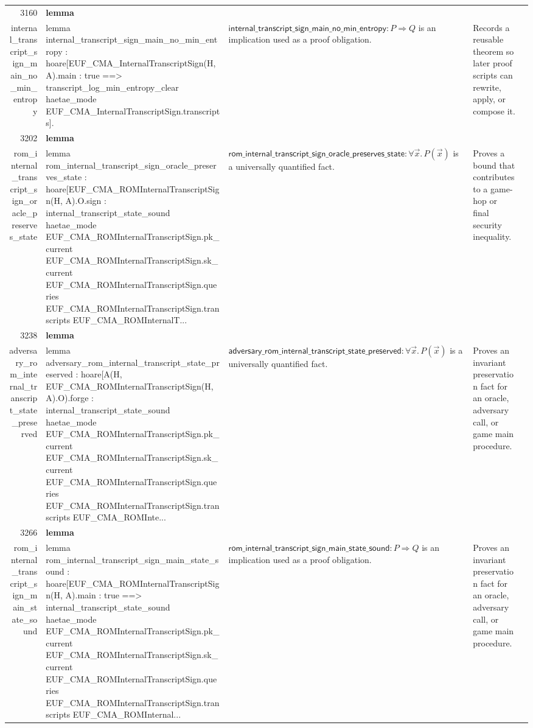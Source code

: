 \documentclass[10pt]{article}
\newcommand{\ec}[1]{\begingroup\ttfamily\scriptsize #1\endgroup}
\begin{document}
\begin{longtable}{r L{0.17\textwidth} L{0.26\textwidth} L{0.27\textwidth} L{0.20\textwidth}}
3160 & \textbf{lemma}\\\ec{internal\_transcript\_sign\_main\_no\_min\_entropy} & \ec{lemma internal\_transcript\_sign\_main\_no\_min\_entropy : hoare[EUF\_CMA\_InternalTranscriptSign(H, A).main : true ==> transcript\_log\_min\_entropy\_clear haetae\_mode EUF\_CMA\_InternalTranscriptSign.transcripts].} & \(\mathsf{internal\_transcript\_sign\_main\_no\_min\_entropy} : P \Rightarrow Q\) is an implication used as a proof obligation. & Records a reusable theorem so later proof scripts can rewrite, apply, or compose it. \\
3202 & \textbf{lemma}\\\ec{rom\_internal\_transcript\_sign\_oracle\_preserves\_state} & \ec{lemma rom\_internal\_transcript\_sign\_oracle\_preserves\_state : hoare[EUF\_CMA\_ROMInternalTranscriptSign(H, A).O.sign : internal\_transcript\_state\_sound haetae\_mode EUF\_CMA\_ROMInternalTranscriptSign.pk\_current EUF\_CMA\_ROMInternalTranscriptSign.sk\_current EUF\_CMA\_ROMInternalTranscriptSign.queries EUF\_CMA\_ROMInternalTranscriptSign.transcripts EUF\_CMA\_ROMInternalT...} & \(\mathsf{rom\_internal\_transcript\_sign\_oracle\_preserves\_state} : \forall \vec{x}.\, P(\vec{x})\) is a universally quantified fact. & Proves a bound that contributes to a game-hop or final security inequality. \\
3238 & \textbf{lemma}\\\ec{adversary\_rom\_internal\_transcript\_state\_preserved} & \ec{lemma adversary\_rom\_internal\_transcript\_state\_preserved : hoare[A(H, EUF\_CMA\_ROMInternalTranscriptSign(H, A).O).forge : internal\_transcript\_state\_sound haetae\_mode EUF\_CMA\_ROMInternalTranscriptSign.pk\_current EUF\_CMA\_ROMInternalTranscriptSign.sk\_current EUF\_CMA\_ROMInternalTranscriptSign.queries EUF\_CMA\_ROMInternalTranscriptSign.transcripts EUF\_CMA\_ROMInte...} & \(\mathsf{adversary\_rom\_internal\_transcript\_state\_preserved} : \forall \vec{x}.\, P(\vec{x})\) is a universally quantified fact. & Proves an invariant preservation fact for an oracle, adversary call, or game main procedure. \\
3266 & \textbf{lemma}\\\ec{rom\_internal\_transcript\_sign\_main\_state\_sound} & \ec{lemma rom\_internal\_transcript\_sign\_main\_state\_sound : hoare[EUF\_CMA\_ROMInternalTranscriptSign(H, A).main : true ==> internal\_transcript\_state\_sound haetae\_mode EUF\_CMA\_ROMInternalTranscriptSign.pk\_current EUF\_CMA\_ROMInternalTranscriptSign.sk\_current EUF\_CMA\_ROMInternalTranscriptSign.queries EUF\_CMA\_ROMInternalTranscriptSign.transcripts EUF\_CMA\_ROMInternal...} & \(\mathsf{rom\_internal\_transcript\_sign\_main\_state\_sound} : P \Rightarrow Q\) is an implication used as a proof obligation. & Proves an invariant preservation fact for an oracle, adversary call, or game main procedure. \\

\end{longtable}
\end{document}
